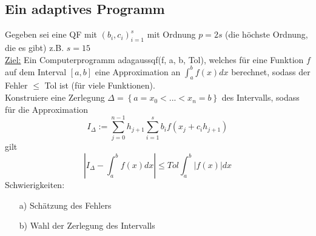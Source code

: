 \subsection{Ein adaptives Programm}

Gegeben sei eine QF mit $(b_i, c_i)_{i=1}^s$ mit Ordnung $p=2s$ (die höchste Ordnung, die es gibt) z.B. $s=15$ \\
\underline{Ziel:} Ein Computerprogramm adagaussqf(f, a, b, Tol), welches für eine Funktion $f$ auf dem Interval $[a, b]$ eine Approximation an $\int_a^b f(x) dx$ berechnet, sodass der Fehler $\leq$ Tol ist (für viele Funktionen). \\
Konstruiere eine Zerlegung $\Delta = \left\{ a = x_0 < ... < x_n = b\right\}$ des Intervalls, sodass für die Approximation 
$$I_\Delta := \sum_{j=0}^{n-1} h_{j+1} \sum_{i=1}^s b_if(x_j + c_ih_{j+1})$$
gilt 
$$\left\vert I_\Delta - \int_a^b f(x) dx \right\vert \leq Tol \int_a^b \vert f(x) \vert dx $$
Schwierigkeiten:

\begin{enumerate}
  \item[a)] Schätzung des Fehlers
  \item[b)] Wahl der Zerlegung des Intervalls 
\end{enumerate}


